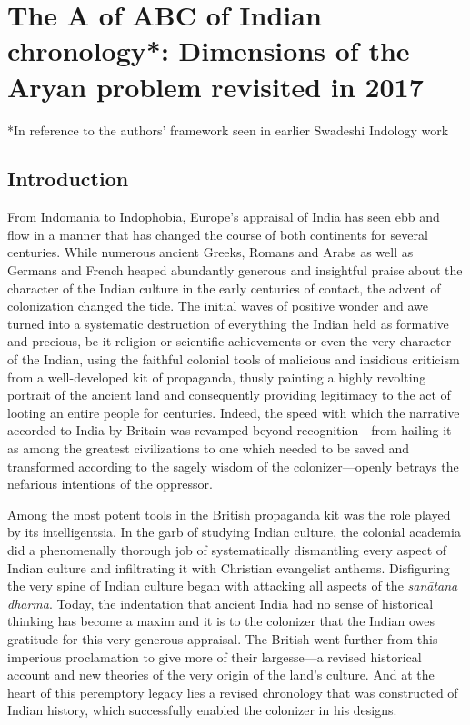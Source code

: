 
\chapter{The A of ABC of Indian chronology*: Dimensions of the Aryan problem revisited in 2017}


*In reference to the authors’ framework seen in earlier Swadeshi Indology work

\section{Introduction}

From Indomania to Indophobia, Europe’s appraisal of India has seen ebb and flow in a manner that has changed the course of both continents for several centuries. While numerous ancient Greeks, Romans and Arabs as well as Germans and French heaped abundantly generous and insightful praise about the character of the Indian culture in the early centuries of contact, the advent of colonization changed the tide. The initial waves of positive wonder and awe turned into a systematic destruction of everything the Indian held as formative and precious, be it religion or scientific achievements or even the very character of the Indian, using the faithful colonial tools of malicious and insidious criticism from a well-developed kit of propaganda, thusly painting a highly revolting portrait of the ancient land and consequently providing legitimacy to the act of looting an entire people for centuries. Indeed, the speed with which the narrative accorded to India by Britain was revamped beyond recognition—from hailing it as among the greatest civilizations to one which needed to be saved and transformed according to the sagely wisdom of the colonizer—openly betrays the nefarious intentions of the oppressor.

Among the most potent tools in the British propaganda kit was the role played by its intelligentsia. In the garb of studying Indian culture, the colonial academia did a phenomenally thorough job of systematically dismantling every aspect of Indian culture and infiltrating it with Christian evangelist anthems. Disfiguring the very spine of Indian culture began with attacking all aspects of the \textit{sanātana dharma}. Today, the indentation that ancient India had no sense of historical thinking has become a maxim and it is to the colonizer that the Indian owes gratitude for this very generous appraisal. The British went further from this imperious proclamation to give more of their largesse—a revised historical account and new theories of the very origin of the land’s culture. And at the heart of this peremptory legacy lies a revised chronology that was constructed of Indian history, which successfully enabled the colonizer in his designs.


